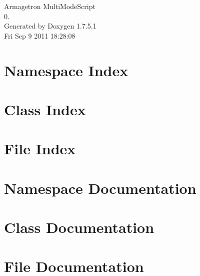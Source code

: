 \documentclass[a4paper]{book}
\begin{document}
\hypersetup{pageanchor=false,citecolor=blue}
\begin{titlepage}
\vspace*{7cm}
\begin{center}
{\Large \-Armagetron \-Multi\-Mode\-Script \\[1ex]\large 0. }\\
\vspace*{1cm}
{\large \-Generated by Doxygen 1.7.5.1}\\
\vspace*{0.5cm}
{\small Fri Sep 9 2011 18:28:08}\\
\end{center}
\end{titlepage}
\clearemptydoublepage
{}
\tableofcontents
\clearemptydoublepage
{}
\hypersetup{pageanchor=true,citecolor=blue}
\chapter{\-Namespace \-Index}

\chapter{\-Class \-Index}

\chapter{\-File \-Index}

\chapter{\-Namespace \-Documentation}




\chapter{\-Class \-Documentation}








\chapter{\-File \-Documentation}













\printindex
\end{document}
